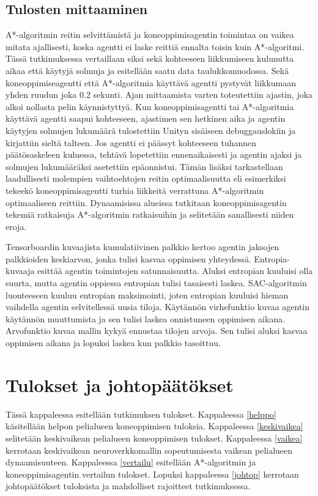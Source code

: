 \documentclass[utf8]{gradu3}
\begin{document}
\section{Tulosten mittaaminen}
\label{sec:mittaaminen}

A*-algoritmin reitin selvittämistä ja koneoppimisagentin toimintaa on vaikea mitata ajallisesti, koska agentti ei laske reittiä ennalta toisin kuin A*-algoritmi. Tässä tutkimuksessa vertaillaan siksi sekä kohteeseen liikkumiseen kulunutta aikaa että käytyjä solmuja ja esitellään saatu data taulukkomuodossa. Sekä koneoppimiseagentti että A*-algoritmia käyttävä agentti pystyvät liikkumaan yhden ruudun joka 0.2 sekunti. Ajan mittaamista varten toteutettiin ajastin, joka alkoi nollasta pelin käynnistyttyä. Kun koneoppimisagentti tai A*-algoritmia käyttävä agentti saapui kohteeseen, ajastimen sen hetkinen aika ja agentin käytyjen solmujen lukumäärä tulostettiin Unityn sisäiseen debuggauslokiin ja kirjattiin sieltä talteen. Jos agentti ei päässyt kohteeseen tuhannen päätösaskeleen kuluessa, tehtävä lopetettiin ennenaikaisesti ja agentin ajaksi ja solmujen lukumääräksi asetettiin epäonnistui. Tämän lisäksi tarkastellaan laadullisesti molempien vaihtoehtojen reitin optimaalisuutta eli esimerkiksi tekeekö koneoppimisagentti turhia liikkeitä verrattuna A*-algoritmin optimaaliseen reittiin. Dynaamisissa alueissa tutkitaan koneoppimisagentin tekemiä ratkaisuja A*-algoritmin ratkaisuihin ja selitetään sanallisesti niiden eroja.

Tensorboardin kuvaajista kumulatiivinen palkkio kertoo agentin jaksojen palkkioiden keskiarvon, jonka tulisi kasvaa oppimisen yhteydessä. Entropia-kuvaaja esittää agentin toimintojen satunnaisuutta. Aluksi entropian kuuluisi olla suurta, mutta agentin oppiessa entropian tulisi tasaisesti laskea. SAC-algoritmin luonteeseen kuuluu entropian maksimointi, joten entropian kuuluisi hieman vaihdella agentin selvitellessä uusia tiloja. Käytännön virhefunktio kuvaa agentin käytännön muuttumista ja sen tulisi laskea onnistuneen oppimisen aikana. Arvofunktio kuvaa mallin kykyä ennustaa tilojen arvoja. Sen tulisi aluksi kasvaa oppimisen aikana ja lopuksi laskea kun palkkio tasoittuu.

\chapter{Tulokset ja johtopäätökset}
\label{tulokset}

Tässä kappaleessa esitellään tutkimuksen tulokset. Kappaleessa \ref{helppo} käsitellään helpon pelialueen koneoppimisen tuloksia. Kappaleessa \ref{keskivaikea} selitetään keskivaikean pelialueen koneoppimisen tulokset. Kappaleessa \ref{vaikea} kerrotaan keskivaikean neuroverkkomallin sopeutumisesta vaikean pelialueen dynaamisuuteen. Kappaleessa \ref{vertailu} esitellään A*-algoritmin ja koneoppimisagentin vertailun tulokset. Lopuksi kappaleessa \ref{johtop} kerrotaan johtopäätökset tuloksista ja mahdolliset rajoitteet tutkimuksessa.
\end{document}
